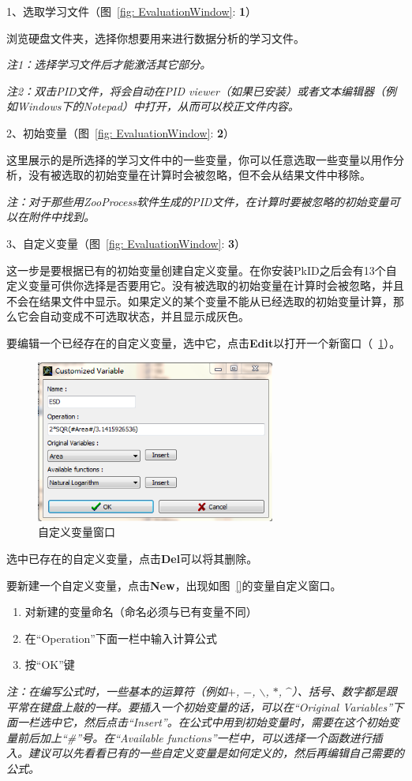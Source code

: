 \documentclass[12pt]{article}
\begin{document}
1、选取学习文件（图~\ref{fig: EvaluationWindow}: {\color{red}\textbf{1}}）

浏览硬盘文件夹，选择你想要用来进行数据分析的学习文件。

{\color{blue}\textit{注1：选择学习文件后才能激活其它部分。}}

{\color{blue}\textit{注2：双击PID文件，将会自动在PID viewer（如果已安装）或者文本编辑器（例如Windows下的Notepad）中打开，从而可以校正文件内容。}}

2、初始变量（图~\ref{fig: EvaluationWindow}: {\color{red}\textbf{2}}）

这里展示的是所选择的学习文件中的一些变量，你可以任意选取一些变量以用作分析，没有被选取的初始变量在计算时会被忽略，但不会从结果文件中移除。

{\color{blue}\textit{注：对于那些用ZooProcess软件生成的PID文件，在计算时要被忽略的初始变量可以在附件中找到。}}

3、自定义变量（图~\ref{fig: EvaluationWindow}: {\color{red}\textbf{3}}）

这一步是要根据已有的初始变量创建自定义变量。在你安装PkID之后会有13个自定义变量可供你选择是否要用它。没有被选取的初始变量在计算时会被忽略，并且不会在结果文件中显示。如果定义的某个变量不能从已经选取的初始变量计算，那么它会自动变成不可选取状态，并且显示成灰色。

要编辑一个已经存在的自定义变量，选中它，点击\textbf{Edit}以打开一个新窗口（~\ref{fig: CustomizedVariableWindow}）。

\begin{figure}[!ht]
\centering
\includegraphics[width=0.7\textwidth]{CustomizedVariableWindow.png}
\caption{自定义变量窗口}
\label{fig: CustomizedVariableWindow}
\end{figure}

选中已存在的自定义变量，点击\textbf{Del}可以将其删除。

要新建一个自定义变量，点击\textbf{New}，出现如图~\ref{}的变量自定义窗口。
\begin{enumerate}
\item 对新建的变量命名（命名必须与已有变量不同）
\item 在“Operation”下面一栏中输入计算公式
\item 按“OK”键
\end{enumerate}
{\color{blue}\textit{注：在编写公式时，一些基本的运算符（例如$+$, $-$, $\backslash$, $*$, $\^$）、括号、数字都是跟平常在键盘上敲的一样。要插入一个初始变量的话，可以在“Original Variables”下面一栏选中它，然后点击“Insert”。在公式中用到初始变量时，需要在这个初始变量前后加上“\#”号。在“Available functions”一栏中，可以选择一个函数进行插入。建议可以先看看已有的一些自定义变量是如何定义的，然后再编辑自己需要的公式。}}
\end{document}
